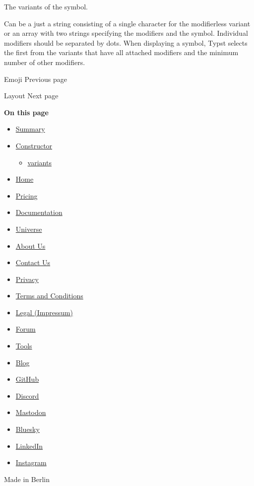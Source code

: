 The variants of the symbol.

Can be a just a string consisting of a single character for the
modifierless variant or an array with two strings specifying the
modifiers and the symbol. Individual modifiers should be separated by
dots. When displaying a symbol, Typst selects the first from the
variants that have all attached modifiers and the minimum number of
other modifiers.

\href{/docs/reference/symbols/emoji/}{\pandocbounded{}}

{ Emoji } { Previous page }

\href{/docs/reference/layout/}{\pandocbounded{}}

{ Layout } { Next page }

\textbf{On this page}

\begin{itemize}
\tightlist
\item
  \hyperref[summary]{Summary}
\item
  \hyperref[constructor]{Constructor}

  \begin{itemize}
  \tightlist
  \item
    \hyperref[constructor-variants]{variants}
  \end{itemize}
\end{itemize}

\begin{itemize}
\tightlist
\item
  \href{/}{Home}
\item
  \href{/pricing/}{Pricing}
\item
  \href{/docs/}{Documentation}
\item
  \href{/universe/}{Universe}
\item
  \href{/about/}{About Us}
\item
  \href{/contact/}{Contact Us}
\item
  \href{/privacy/}{Privacy}
\item
  \href{https://typst.app/terms}{Terms and Conditions}
\item
  \href{/legal/}{Legal (Impressum)}
\end{itemize}

\begin{itemize}
\tightlist
\item
  \href{https://forum.typst.app}{Forum}
\item
  \href{/tools/}{Tools}
\item
  \href{/blog/}{Blog}
\item
  \href{https://github.com/typst/}{GitHub}
\item
  \href{https://discord.gg/2uDybryKPe}{Discord}
\item
  \href{https://mastodon.social/@typst}{Mastodon}
\item
  \href{https://bsky.app/profile/typst.app}{Bluesky}
\item
  \href{https://www.linkedin.com/company/typst/}{LinkedIn}
\item
  \href{https://instagram.com/typstapp/}{Instagram}
\end{itemize}

Made in Berlin
